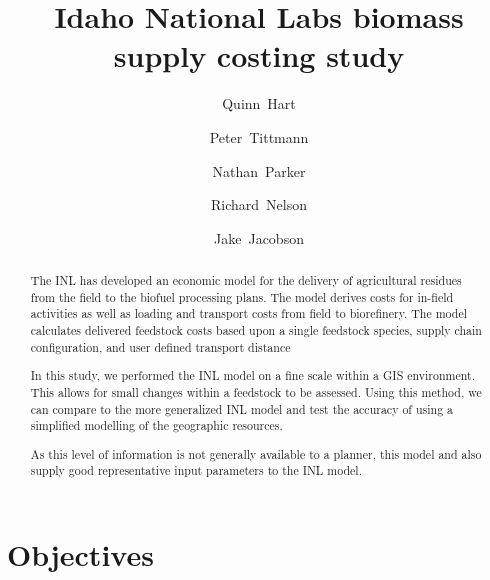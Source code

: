 \documentclass{elsart}
\begin{document}
%
\begin{frontmatter}
\title{Idaho National Labs biomass supply costing study}
%
\author[ucd]{Quinn~Hart}
\author[ucd]{Peter~Tittmann}
\author[ucd]{Nathan~Parker}
\author[ksu]{Richard~Nelson}
\author[inl]{Jake~Jacobson}
\address[ucd]{University of California, Davis, Davis, CA, USA }
\address[inl]{Idaho National Labs, Idaho Falls, ID, USA }
\address[ksu]{Kansas State University, Manhattan, KS, USA }

\begin{abstract}

The \ac{INL} has developed an economic model for the delivery of agricultural residues from the field to the biofuel processing plans. The model derives costs for in-field activities as well as loading and transport costs from field to biorefinery.  The model calculates delivered feedstock costs based upon a single feedstock species, supply chain configuration, and user defined  transport distance

  In this study, we performed the \ac{INL} model on a fine scale
  within a \ac{GIS} environment.  This allows for small changes within
  a feedstock to be assessed.  Using this method, we can compare to
  the more generalized \ac{INL} model and test the accuracy of using a
  simplified modelling of the geographic resources.

  As this level of information is not generally available to a
  planner, this model and also supply good representative input
  parameters to the \ac{INL} model.

\end{abstract}

\end{frontmatter}                                

\thispagestyle{plain}


\section{Objectives}
\label{sec:objectives}
\end{document}
